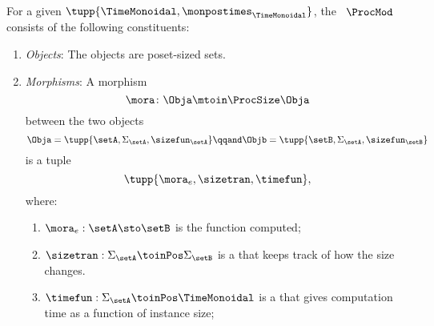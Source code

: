 \begin{definition}
    \label{def:ProcMod}
    For a given  $\tupp{\TimeMonoidal, \monpostimes_{\TimeMonoidal}}$, the ~$\ProcMod$ consists of the following constituents:
    \begin{enumerate}
        \item \emph{Objects}: The objects are poset-sized sets.
        \item \emph{Morphisms}: A morphism
              \begin{equation}
                  \mora \colon \Obja \mtoin\ProcSize \Obja
              \end{equation}
              between the two objects
              \begin{equation}
                  \Obja = \tupp{\setA, \Sigma_{\setA}, \sizefun_{\setA}}
                  \qqand
                  \Objb = \tupp{\setB, \Sigma_{\setA}, \sizefun_{\setB}}
              \end{equation}
              is a tuple
              \begin{equation}
                  \tupp{\mora_e, \sizetran, \timefun },
              \end{equation}
              where:
              \begin{enumerate}
                  \item $\mora_e : \setA \sto \setB$ is the function computed;
                  \item $\sizetran: \Sigma_{\setA} \toinPos \Sigma_{\setB}$ is a  that keeps track of how the size changes.
                  \item $\timefun: \Sigma_{\setA} \toinPos \TimeMonoidal$ is a  that gives computation time as a function of instance size;
              \end{enumerate}


\end{enumerate}
\end{definition}

